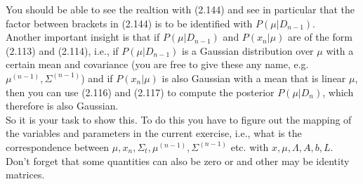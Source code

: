 \documentclass[a4paper]{article}
\begin{document}
You should be able to see the realtion with (2.144) and see in particular that the factor between brackets in (2.144) is to be identified with $P(\mu | D_{n - 1})$.\\
Another important insight is that if $P(\mu | D_{n - 1})$ and $P(x_n | \mu)$ are of the form (2.113) and (2.114), i.e., if $P(\mu | D_{n - 1})$ is a Gaussian distribution over $\mu$ with a certain mean and covariance (you are free to give these any name, e.g. $\mu^{(n-1)}, \Sigma^{(n-1)}$) and if $P(x_n | \mu)$ is also Gaussian with a mean that is linear $\mu$, then you can use (2.116) and (2.117) to compute the posterior $P(\mu | D_n)$, which therefore is also Gaussian.\\
So it is your task to show this. To do this you have to figure out the mapping of the variables and parameters in the current exercise, i.e., what is the correspondence between $\mu, x_n, \Sigma_t, \mu^{(n-1)}, \Sigma^{(n-1)}$ etc. with $x, \mu, \Lambda, A, b, L$. Don't forget that some quantities can also be zero or and other may be identity matrices.
\end{document}

